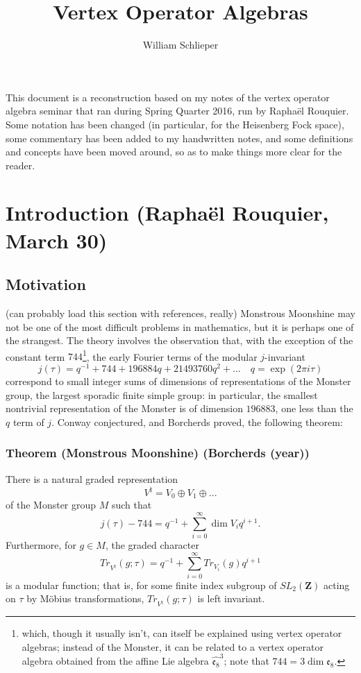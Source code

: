 \documentclass{article}
\author{William Schlieper}
\title{Vertex Operator Algebras}
\newcommand{\ZZ}{\mathbold{Z}}
\begin{document}
\maketitle
This document is a reconstruction based on my notes of the vertex operator algebra seminar
that ran during Spring Quarter 2016, run by Raphaël Rouquier.  Some notation has been changed (in particular, for the Heisenberg Fock space), some commentary has been added to my handwritten notes, and some definitions and concepts have been moved around, so as to make things more clear for the reader.

\tableofcontents

\section{Introduction (Raphaël Rouquier, March 30)}
\label{sec:intro}

\subsection{Motivation}
\label{sec:mot}
(can probably load this section with references, really)
Monstrous Moonshine may not be one of the most difficult problems in mathematics, but it is perhaps one of the strangest.  The theory involves the observation that, with the exception of the constant term $744$\footnote{which, though it usually isn't, can itself be explained using vertex operator algebras; instead of the Monster, it can be related to a vertex operator algebra obtained from the affine Lie algebra $\widehat{\mathfrak{e}_8}^3$; note that $744=3 \dim \mathfrak{e}_8$.}, the early Fourier terms of the modular $j$-invariant
\[j(\tau)=q^{-1}+744+196884q+21493760q^2+... \quad q=\exp(2 \pi i \tau)\]
correspond to small integer sums of dimensions of representations of the Monster group, the largest sporadic finite simple group: in particular, the smallest nontrivial representation of the Monster is of dimension $196883$, one less than the $q$ term of $j$.  Conway conjectured, and Borcherds proved, the following theorem:
\subsubsection{Theorem (Monstrous Moonshine) (Borcherds (year))}
\label{sec:monmoon}
There is a natural graded representation
\[V^\natural = V_0 \oplus V_1 \oplus ... \]
of the Monster group $M$ such that
\[j(\tau)-744=q^{-1}+\sum_{i=0}^{\infty} \dim V_i q^{i+1}. \]
Furthermore, for $g \in M$, the graded character
\[Tr_{V^\natural}(g;\tau)=q^{-1}+\sum_{i=0}^{\infty} Tr_{V_i}(g) q^{i+1} \]
is a modular function; that is, for some finite index subgroup of $SL_2(\ZZ)$ acting on $\tau$ by Möbius transformations, $Tr_{V^\natural}(g;\tau)$ is left invariant.
\end{document}
